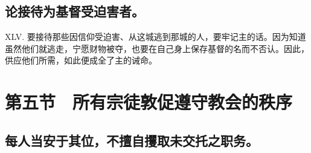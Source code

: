 
\subsection{论接待为基督受迫害者。}

XLV. 要接待那些因信仰受迫害、从这城逃到那城的人，要牢记主的话。因为知道虽然他们就逃走，宁愿财物被夺，也要在自己身上保存基督的名而不否认。因此，供应他们所需，如此便成全了主的诫命。\par


\section{第五节　所有宗徒敦促遵守教会的秩序}


\subsection{每人当安于其位，不擅自攫取未交托之职务。}

